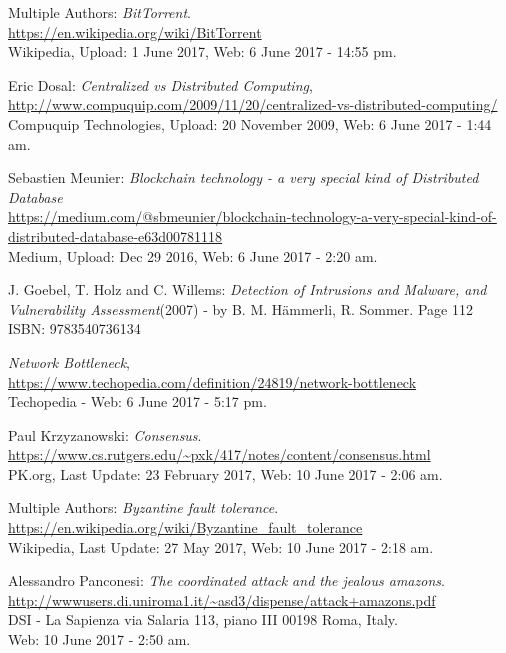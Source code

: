 \documentclass[paper=a4, fontsize=11pt]{scrartcl} %
\numberwithin{equation}{section} %
\numberwithin{figure}{section} %
\numberwithin{table}{section} %
\begin{document}
\begin{thebibliography}{9}
Multiple Authors:
\textit{BitTorrent}.\\
\url{https://en.wikipedia.org/wiki/BitTorrent}\\ 
Wikipedia, Upload: 1 June 2017, Web: 6 June 2017 - 14:55 pm.
 
Eric Dosal: \textit{Centralized vs Distributed Computing},
\\\url{http://www.compuquip.com/2009/11/20/centralized-vs-distributed-computing/}\\ Compuquip Technologies, Upload:
20 November 2009, Web: 6 June 2017 - 1:44 am. 

\newpage
{}
Sebastien Meunier: \textit{Blockchain technology - a very special kind of Distributed Database} \\
\url{https://medium.com/@sbmeunier/blockchain-technology-a-very-special-kind-of-distributed-database-e63d00781118}\\
Medium, Upload: Dec 29 2016, Web: 6 June 2017 - 2:20 am.

J. Goebel, T. Holz and C. Willems: \textit{Detection of Intrusions and Malware, and Vulnerability Assessment}(2007) - by B. M. Hämmerli, R. Sommer. Page 112 \\ ISBN: 9783540736134

\textit{Network Bottleneck},
\\\url{https://www.techopedia.com/definition/24819/network-bottleneck}\\ Techopedia - Web: 6 June 2017 - 5:17 pm.

Paul Krzyzanowski:
\textit{Consensus}.\\
\url{https://www.cs.rutgers.edu/~pxk/417/notes/content/consensus.html}\\ 
PK.org, Last Update: 23 February 2017, Web: 10 June 2017 - 2:06 am.

Multiple Authors:
\textit{Byzantine fault tolerance}.\\
\url{https://en.wikipedia.org/wiki/Byzantine_fault_tolerance}\\ 
Wikipedia, Last Update: 27 May 2017, Web: 10 June 2017 - 2:18 am.

Alessandro Panconesi:
\textit{The coordinated attack and the jealous amazons}.\\
\url{http://wwwusers.di.uniroma1.it/~asd3/dispense/attack+amazons.pdf}\\ 
DSI - La Sapienza via Salaria 113, piano III
00198 Roma, Italy.\\ Web: 10 June 2017 - 2:50 am.


\end{thebibliography}
\end{document}
